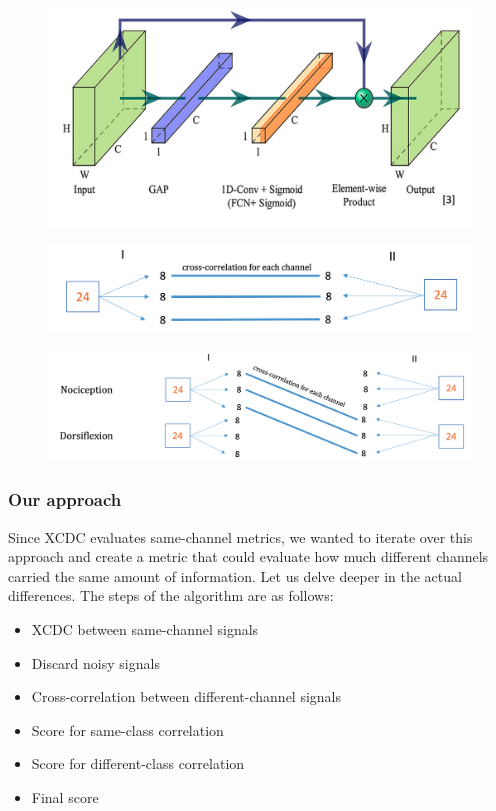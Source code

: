 \documentclass{Configuration_Files/PoliMi3i_thesis}
\begin{document}
\begin{figure}[H]
	\includegraphics[scale=0.4]{channelLayer.png}
	\centering
	\end{figure}

\begin{figure}[H]
	\includegraphics[scale=0.4]{dataSplit.png}
	\centering
	\end{figure}



	\begin{figure}[H]
		\includegraphics[scale=0.4]{scoreDifferentClass.png}
		\centering
		\end{figure}
	

\subsubsection{Our approach}

Since XCDC evaluates same-channel metrics, we wanted to iterate over this approach and create a metric that could evaluate how much different channels carried the same amount of information.
Let us delve deeper in the actual differences.
The steps of the algorithm are as follows:

\begin{itemize}
	\item XCDC between same-channel signals
	\item Discard noisy signals
	\item Cross-correlation between different-channel signals
	\item Score for same-class correlation
	\item Score for different-class correlation
	\item Final score
\end{itemize}
\end{document}
